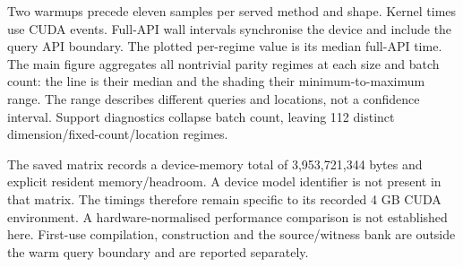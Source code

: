 Two warmups precede eleven samples per served method and shape.
Kernel times use CUDA events.
Full-API wall intervals synchronise the device and include the query API boundary.
The plotted per-regime value is its median full-API time.
The main figure aggregates all nontrivial parity regimes at each size and batch count: the line is their median and the shading their minimum-to-maximum range.
The range describes different queries and locations, not a confidence interval.
Support diagnostics collapse batch count, leaving 112 distinct dimension/fixed-count/location regimes.

The saved matrix records a device-memory total of 3,953,721,344 bytes and explicit resident memory/headroom.
A device model identifier is not present in that matrix.
The timings therefore remain specific to its recorded 4 GB CUDA environment.
A hardware-normalised performance comparison is not established here.
First-use compilation, construction and the source/witness bank are outside the warm query boundary and are reported separately.

